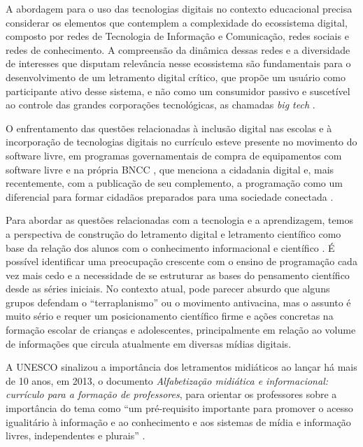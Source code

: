 \documentclass[portuguese]{textolivre}
\begin{document}
A abordagem para o uso das tecnologias digitais no contexto educacional precisa considerar os elementos que contemplem a complexidade do ecossistema digital, composto por redes de Tecnologia de Informação e Comunicação, redes sociais e redes de conhecimento. A compreensão da dinâmica dessas redes e a diversidade de interesses que disputam relevância nesse ecossistema são fundamentais para o desenvolvimento de um letramento digital crítico, que propõe um usuário como participante ativo desse sistema, e não como um consumidor passivo e suscetível ao controle das grandes corporações tecnológicas, as chamadas \textit{big tech} \cite{silveira_como_2023}.

O enfrentamento das questões relacionadas à inclusão digital nas escolas e à incorporação de tecnologias digitais no currículo esteve presente no movimento do software livre, em programas governamentais de compra de equipamentos com software livre e na própria BNCC \cite{brasil_base_2018}, que menciona a cidadania digital e, mais recentemente, com a publicação de seu complemento, a programação como um diferencial para formar cidadãos preparados para uma sociedade conectada \cite{brasil_parecer_2022}.

Para abordar as questões relacionadas com a tecnologia e a aprendizagem, temos a perspectiva de construção do letramento digital e letramento científico como base da relação dos alunos com o conhecimento informacional e científico \cite{carvalho_divulgacao_2023}. É possível identificar uma preocupação crescente com o ensino de programação cada vez mais cedo e a necessidade de se estruturar as bases do pensamento científico desde as séries iniciais. No contexto atual, pode parecer absurdo que alguns grupos defendam o ``terraplanismo'' ou o movimento antivacina, mas o assunto é muito sério e requer um posicionamento científico firme e ações concretas na formação escolar de crianças e adolescentes, principalmente em relação ao volume de informações que circula atualmente em diversas mídias digitais.

A UNESCO sinalizou a importância dos letramentos midiáticos ao lançar há mais de 10 anos, em 2013, o documento \textit{Alfabetização midiática e informacional: currículo para a formação de professores}, para orientar os professores sobre a importância do tema como ``um pré-requisito importante para promover o acesso igualitário à informação e ao conhecimento e aos sistemas de mídia e informação livres, independentes e plurais'' \cite[p.~5]{wilson_alfabetizacao_2013}.
\end{document}
